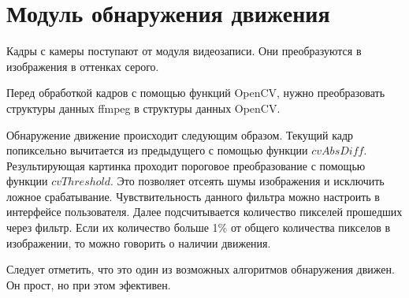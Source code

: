 \newpage

\section{Модуль обнаружения движения}
Кадры с камеры поступают от модуля видеозаписи.
Они преобразуются в изображения в оттенках серого.

Перед обработкой кадров с помощью функций OpenCV, нужно преобразовать структуры данных ffmpeg
в структуры данных OpenCV.

Обнаружение движение происходит следующим образом.
Текущий кадр попиксельно вычитается из предыдущего с помощью функции $cvAbsDiff$.
Результирующая картинка проходит пороговое преобразование с помощью функции $cvThreshold$.
Это позволяет отсеять шумы изображения и исключить ложное срабатывание.
Чувствительность данного фильтра можно настроить в интерфейсе пользователя.
Далее подсчитывается количество пикселей прошедших через фильтр.
Если их количество больше 1\% от общего количества пикселов в изображении,
то можно говорить о наличии движения.

Следует отметить, что это один из возможных алгоритмов обнаружения движен.
Он прост, но при этом эфективен.

